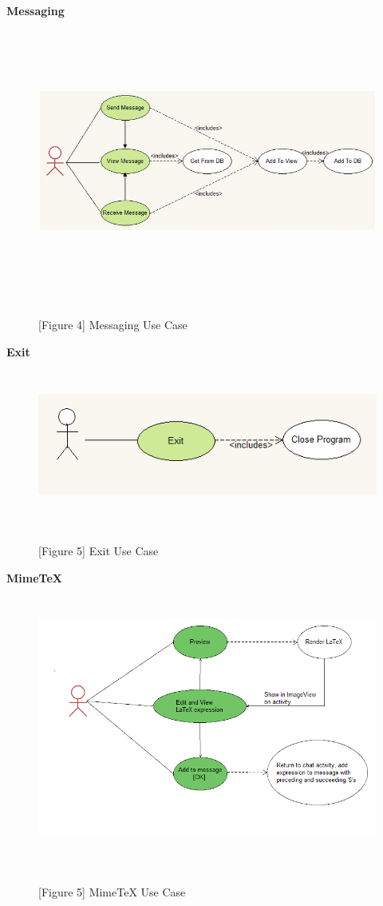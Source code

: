 \documentclass[29pt,a4paper]{moderncv}
\begin{document}
		\noindent \left\textbf{Messaging}\\
		\begin{figure}
			\centering
			\\ \includegraphics[width=6.0in, height=3in]{./messagingUseCase.jpg}
			\\\caption{[Figure 4] Messaging Use Case}\\
		\end{figure}
\newpage		
		\noindent \left\textbf{Exit}\\
		\begin{figure}
			\centering
			\\ \includegraphics[width=6.0in, height=1.5in]{./exitCase.png}
			\\\caption{[Figure 5] Exit Use Case}\\
		\end{figure}
		
	
		\noindent \left\textbf{MimeTeX}\\
		\begin{figure}
			\centering
			\\ \includegraphics[width=6.0in, height=3.0in]{./MimeTeXUseCase.png}
			\\\caption{[Figure 5] MimeTeX Use Case}\\
		\end{figure}
		
\end{document}
